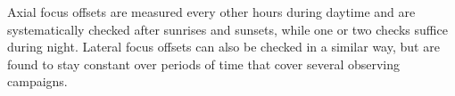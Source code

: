 {\lp Axial focus offsets are measured every other hours during daytime and
are systematically checked after sunrises and sunsets, while one or
two checks suffice during night. 
Lateral focus offsets can also be checked in a similar way, but are
found to stay constant over periods of time that cover several
observing campaigns.}





